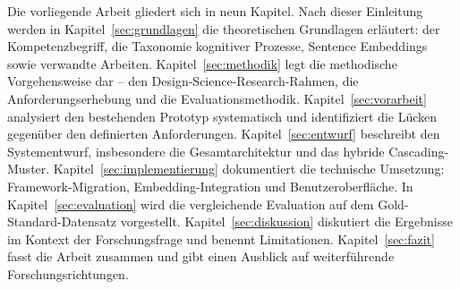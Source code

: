 Die vorliegende Arbeit gliedert sich in neun Kapitel.
Nach dieser Einleitung werden in Kapitel~\ref{sec:grundlagen} die theoretischen Grundlagen erläutert: der Kompetenzbegriff, die Taxonomie kognitiver Prozesse, Sentence Embeddings sowie verwandte Arbeiten.
Kapitel~\ref{sec:methodik} legt die methodische Vorgehensweise dar -- den Design-Science-Research-Rahmen, die Anforderungserhebung und die Evaluationsmethodik.
Kapitel~\ref{sec:vorarbeit} analysiert den bestehenden Prototyp systematisch und identifiziert die Lücken gegenüber den definierten Anforderungen.
Kapitel~\ref{sec:entwurf} beschreibt den Systementwurf, insbesondere die Gesamtarchitektur und das hybride Cascading-Muster.
Kapitel~\ref{sec:implementierung} dokumentiert die technische Umsetzung: Framework-Migration, Embedding-Integration und Benutzeroberfläche.
In Kapitel~\ref{sec:evaluation} wird die vergleichende Evaluation auf dem Gold-Standard-Datensatz vorgestellt.
Kapitel~\ref{sec:diskussion} diskutiert die Ergebnisse im Kontext der Forschungsfrage und benennt Limitationen.
Kapitel~\ref{sec:fazit} fasst die Arbeit zusammen und gibt einen Ausblick auf weiterführende Forschungsrichtungen.
